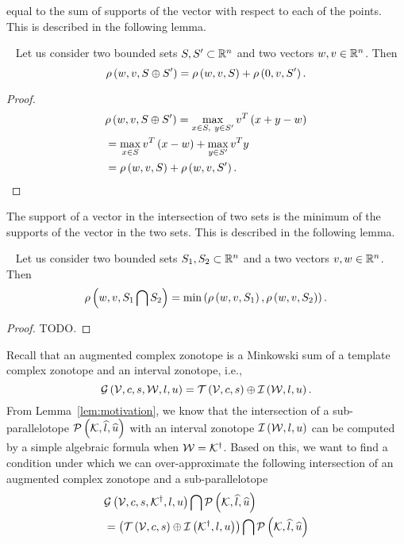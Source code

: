 equal to the sum of supports of the vector with respect to each of the
points.  This is described in the following lemma.
%
\begin{lemma}~\label{lem:support-minsum}
Let us consider two bounded sets $S,S^\prime\subset\mathbb{R}^n$ and two
vectors $w,v\in\mathbb{R}^n$.  Then
%
\[
\rho\left(w,v,S\oplus S^\prime\right)=\rho\left(w,v,S\right)+\rho\left(0,v,S^\prime\right).
\]
%
\end{lemma}
%
\begin{proof}
  \begin{align*}
& \rho\left(w,v,S\oplus S^\prime\right)=\max_{x\in S,~y\in
      S^\prime}v^T\left(x+y-w\right)\\
    & = \max_{x\in S}v^T\left(x-w\right)+\max_{y\in S^\prime}v^Ty\\
    & = \rho\left(w,v,S\right)+\rho\left(w,v,S^\prime\right).~~~~~~~~~~\qedhere
  \end{align*}
\end{proof}
%
The support of a vector in the intersection of two sets is the minimum
of the supports of the vector in the two sets.  This is described in
the following lemma.
%
\begin{lemma}~\label{lem:support-intersection}
Let us consider two bounded sets $S_1,S_2\subset\mathbb{R}^n$ and a two
vectors $v,w\in\mathbb{R}^n$.  Then
%
\[
\rho\left(w,v,S_1\bigcap S_2\right)=\min\left(\rho\left(w,v,S_1\right),\rho\left(w,v,S_2\right)\right).
\]
%
\end{lemma}
%
\begin{proof}
  {\color{red} TODO}.
\end{proof}
%
Recall that an augmented complex zonotope is a Minkowski sum of a
template complex zonotope and an interval zonotope, i.e.,
%
\[
\mathcal{G}\left(\mathcal{V},c,s,\mathcal{W},l,u\right)=\mathit{\operatorname{\mathcal{T}}}\left(\mathcal{V},c,s\right)\oplus \mathit{\operatorname{\mathcal{I}}}\left(\mathcal{W},l,u\right).
\]
%
From
Lemma~\ref{lem:motivation}, we know that the intersection of a
sub-parallelotope $\mathcal{P}\left(\mathcal{K},\widehat{l},\widehat{u}\right)$ with an interval
zonotope $\mathit{\operatorname{\mathcal{I}}}\left(\mathcal{W},l,u\right)$ can be computed by a simple
algebraic formula when
$\mathcal{W}={\mathcal{K}}^\dagger$.  Based on this, we want to find a condition
under which we can over-approximate the following intersection of an
augmented complex zonotope and a sub-parallelotope
%
\begin{align*}
& \mathcal{G}\left(\mathcal{V},c,s,{\mathcal{K}}^\dagger,l,u\right)\bigcap \mathcal{P}\left(\mathcal{K},\widehat{l},\widehat{u}\right)\\
& =\left(\mathit{\operatorname{\mathcal{T}}}\left(\mathcal{V},c,s\right)\oplus \mathit{\operatorname{\mathcal{I}}}\left({\mathcal{K}}^\dagger,l,u\right)\right)\bigcap \mathcal{P}\left(\mathcal{K},\widehat{l},\widehat{u}\right)
\end{align*}
